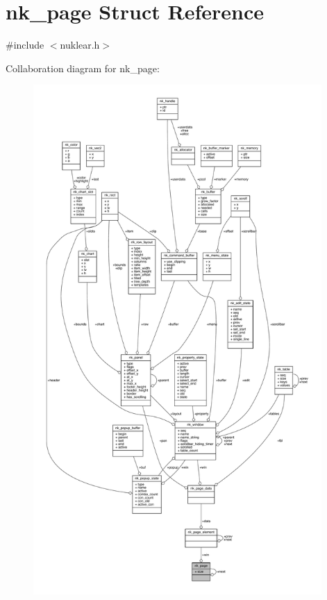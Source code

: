 \hypertarget{structnk__page}{}\section{nk\+\_\+page Struct Reference}
\label{structnk__page}


{\ttfamily \#include $<$nuklear.\+h$>$}



Collaboration diagram for nk\+\_\+page\+:
\nopagebreak
\begin{figure}[H]
\begin{center}
\leavevmode
\includegraphics[height=550pt]{structnk__page__coll__graph}
\end{center}
\end{figure}
